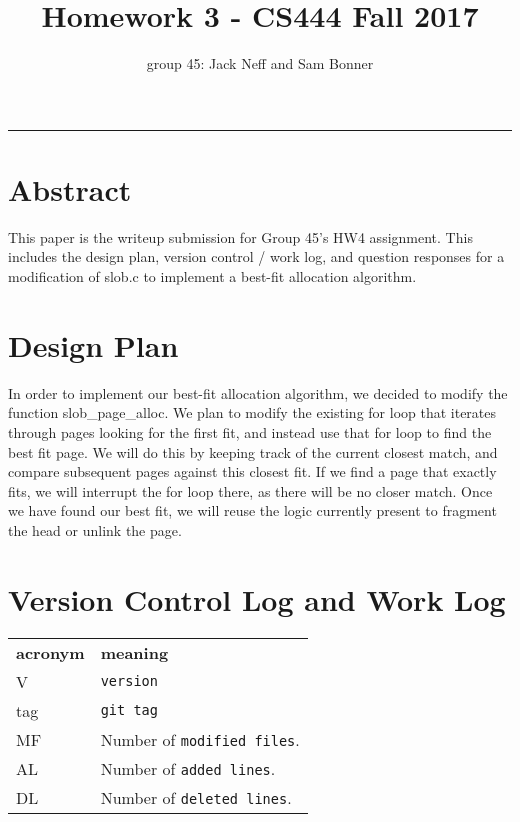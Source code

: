 \documentclass[letterpaper,10pt,fleqn]{article}
\title{Homework 3 - CS444 Fall 2017}
\author{group 45: Jack Neff and Sam Bonner}
\begin{document}
\maketitle
\hrule

\section*{Abstract}

This paper is the writeup submission for Group 45's HW4 assignment. This includes the design plan, version control / work log, and question responses for a modification of slob.c to implement a best-fit allocation algorithm.

\pagebreak
\section*{Design Plan}

In order to implement our best-fit allocation algorithm, we decided to modify the function slob\_page\_alloc. We plan to modify the existing for loop that iterates through pages looking for the first fit, and instead use that for loop to find the best fit page. We will do this by keeping track of the current closest match, and compare subsequent pages against this closest fit. If we find a page that exactly fits, we will interrupt the for loop there, as there will be no closer match. Once we have found our best fit, we will reuse the logic currently present to fragment the head or unlink the page.

\section*{Version Control Log and Work Log}
 
 \begin{tabular}{lp{8cm}}
  \label{tabular:legend:git-log}
  \textbf{acronym} & \textbf{meaning} \\
  V & \texttt{version} \\
  tag & \texttt{git tag} \\
  MF & Number of \texttt{modified files}. \\
  AL & Number of \texttt{added lines}. \\
  DL & Number of \texttt{deleted lines}. \\
\end{tabular}

\bigskip
\end{document}
